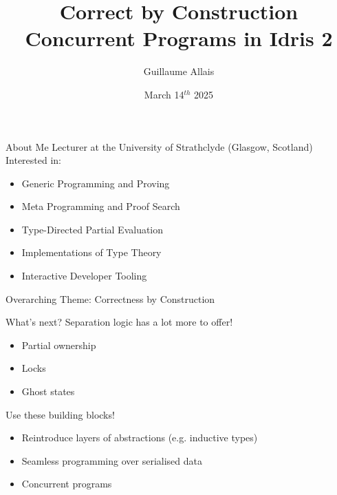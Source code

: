 \documentclass[3to2]{beamer}
\title{Correct by Construction Concurrent Programs \newline in Idris 2}
\author{Guillaume Allais}
\institute{University of Strathclyde \\ Glasgow, UK}
\date{March 14$^{th}$ 2025}
\newcommand{\bobhead}{\texttt{[image: assets/bob.png]}}
\begin{document}
\begin{frame}
  \maketitle
{}
\end{frame}

{
\begin{frame}{About Me}
  Lecturer at the University of Strathclyde (Glasgow, Scotland)
  \vfill
  Interested in:
  \begin{itemize}
    \item Generic Programming and Proving
    \item Meta Programming and Proof Search
    \item Type-Directed Partial Evaluation
    \item Implementations of Type Theory
    \item Interactive Developer Tooling
  \end{itemize}
  \vfill
  Overarching Theme: Correctness by Construction
\end{frame}}






\begin{frame}{What's next?}
Separation logic has a lot more to offer!

  \begin{itemize}
    \item Partial ownership
    \item Locks
    \item Ghost states
  \end{itemize}

\vfill

Use these building blocks!

  \begin{itemize}
    \item Reintroduce layers of abstractions (e.g. inductive types)
    \item Seamless programming over serialised data
    \item Concurrent programs
  \end{itemize}
\end{frame}
\end{document}
